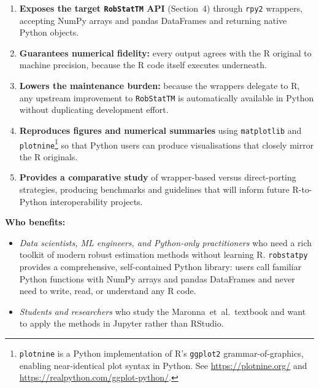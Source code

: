 \documentclass[11pt, a4paper]{article}
\begin{document}
\begin{enumerate}[leftmargin=2em]
  \item \textbf{Exposes the target \texttt{RobStatTM} API} (Section~4) through
    \texttt{rpy2} wrappers, accepting NumPy arrays and pandas DataFrames
    and returning native Python objects.
  \item \textbf{Guarantees numerical fidelity:} every output agrees
    with the R original to machine precision, because the R code itself
    executes underneath.
  \item \textbf{Lowers the maintenance burden:} because the wrappers
    delegate to R, any upstream improvement to \texttt{RobStatTM} is
    automatically available in Python without duplicating development
    effort.
  \item \textbf{Reproduces figures and numerical summaries} using
    \texttt{matplotlib} and \texttt{plotnine}\footnote{\texttt{plotnine}
    is a Python implementation of R's \texttt{ggplot2}
    grammar-of-graphics, enabling near-identical plot syntax in Python.
    See \url{https://plotnine.org/} and \url{https://realpython.com/ggplot-python/}.}
    so that Python users can produce visualisations that closely
    mirror the R originals.
  \item \textbf{Provides a comparative study} of wrapper-based versus
    direct-porting strategies, producing benchmarks and guidelines that
    will inform future R-to-Python interoperability projects.
\end{enumerate}

\noindent
\textbf{Who benefits:}
\begin{itemize}[leftmargin=1.5em, itemsep=2pt]
  \item \emph{Data scientists, ML engineers, and Python-only practitioners}
    who need a rich toolkit of modern robust estimation methods without
    learning R. \texttt{robstatpy} provides a comprehensive, self-contained
    Python library: users call familiar Python functions with NumPy arrays
    and pandas DataFrames and never need to write, read, or understand any
    R code.
  \item \emph{Students and researchers} who study the Maronna~et~al.\
    textbook and want to apply the methods in Jupyter rather than RStudio.
\end{itemize}

\end{document}
